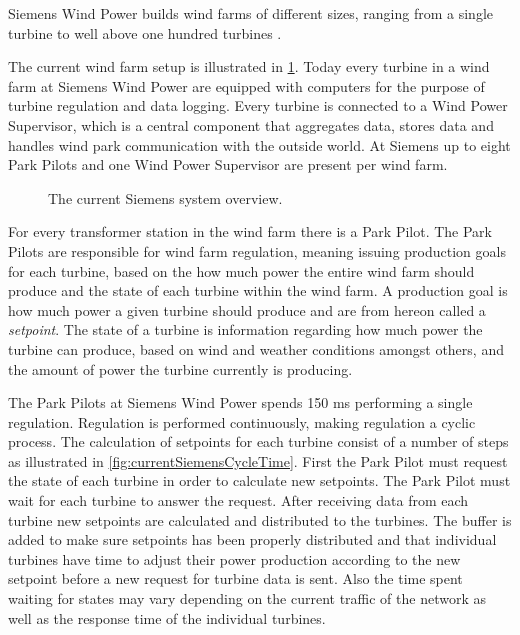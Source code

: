 
\label{sec:SiemensCase}
Siemens Wind Power builds wind farms of different sizes, ranging from a single turbine to well above one hundred turbines \cite{simensOffShoreProjects, simensOnShoreProjects}. 

The current wind farm setup is illustrated in \cref{fig:currentSiemensSetup}. Today every turbine in a wind farm at Siemens Wind Power are equipped with computers for the purpose of turbine regulation and data logging. Every turbine is connected to a Wind Power Supervisor, which is a central component that aggregates data, stores data and handles wind park communication with the outside world. At Siemens up to eight Park Pilots and one Wind Power Supervisor are present per wind farm.

\begin{figure}[!h]
	\centering
	\scalebox{0.7}{}
	\caption[The current Siemens wind farm system overview]{
		\label{fig:currentSiemensSetup} 
		\footnotesize{%
			The current Siemens system overview.
		}
	}
\end{figure}

For every transformer station in the wind farm there is a Park Pilot. The Park Pilots are responsible for wind farm regulation, meaning issuing production goals for each turbine, based on the how much power the entire wind farm should produce and the state of each turbine within the wind farm. A production goal is how much power a given turbine should produce and are from hereon called a \textit{setpoint}. The state of a turbine is information regarding how much power the turbine can produce, based on wind and weather conditions amongst others, and the amount of power the turbine currently is producing. 

The Park Pilots at Siemens Wind Power spends 150 ms performing a single regulation. Regulation is performed continuously, making regulation a cyclic process. The calculation of setpoints for each turbine consist of a number of steps as illustrated in \cref{fig:currentSiemensCycleTime}. First the Park Pilot must request the state of each turbine in order to calculate new setpoints. The Park Pilot must wait for each turbine to answer the request. After receiving data from each turbine new setpoints are calculated and distributed to the turbines. The buffer is added to make sure setpoints has been properly distributed and that individual turbines have time to adjust their power production according to the new setpoint before a new request for turbine data is sent. Also the time spent waiting for states may vary depending on the current traffic of the network as well as the response time of the individual turbines.

